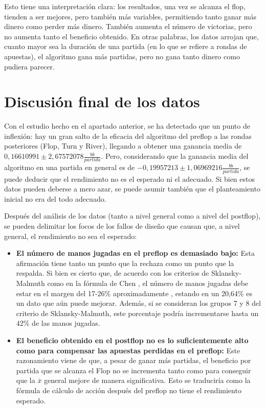 Esto tiene una interpretación clara: los resultados, una vez se alcanza el flop, tienden a ser mejores, pero también más variables, permitiendo tanto ganar más dinero como perder más dinero. También aumenta el número de victorias, pero no aumenta tanto el beneficio obtenido. 
 En otras palabras, los datos arrojan que, cuanto mayor sea la duración de una partida (en lo que se refiere a rondas de apuestas), el algoritmo gana más partidas, pero no gana tanto dinero como pudiera parecer.


\section{Discusión final de los datos}
\label{sec:discusion}

Con el estudio hecho en el apartado anterior, se ha detectado que un punto de inflexión: hay un gran salto de la eficacia del algoritmo del preflop a las rondas posteriores (Flop, Turn y River), llegando a obtener una ganancia media de $0,16610991\pm 2,67572078 $$\frac{bb}{partida}$. 
Pero, considerando que la ganancia media del algoritmo en una partida en general es de $-0,19957213\pm1,06969216$$\frac{bb}{partida}$, se puede deducir que el rendimiento no es el esperado ni el adecuado. Si bien estos datos pueden deberse a mero azar, se puede asumir también que el planteamiento inicial no era del todo adecuado.

Después del análisis de los datos (tanto a nivel general como a nivel del postflop), se pueden delimitar los focos de los fallos de diseño que causan que, a nivel general, el rendimiento no sea el esperado:

\begin{itemize}
\item \textbf{El número de manos jugadas en el preflop es demasiado bajo:} Esta afirmación tiene tanto un punto que la rechaza como un punto que la respalda. Si bien es cierto que, de acuerdo con los criterios de Sklansky-Malmuth \cite{sklansky} como en la fórmula de Chen \cite{krieger}, el número de manos jugadas debe estar en el margen del 17-26\% aproximadamente , estando en un 20,64\% es un dato que aún puede mejorar. Además, si se consideran los grupos 7 y 8 del criterio de Sklansky-Malmuth, este porcentaje podría incrementarse hasta un 42\% de las manos jugadas.
\item \textbf{El beneficio obtenido en el postflop no es lo suficientemente alto como para compensar las apuestas perdidas en el preflop:} Este razonamiento viene de que, a pesar de ganar más partidas, el beneficio por partida que se alcanza el Flop no se incrementa tanto como para conseguir que la $\bar{x}$ general mejore de manera significativa. Esto se traduciría como la fórmula de cálculo de acción después del preflop no tiene el rendimiento esperado.
\end{itemize}

